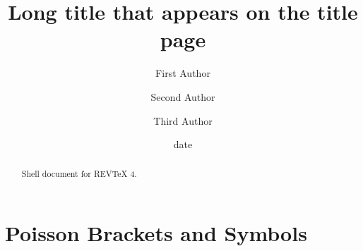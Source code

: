 \documentclass[aps,preprint]{revtex4}%
\begin{document}
\title[Short title for running header]{Long title that appears on the title page}
\author{First Author}
\author{Second Author}
\author{Third Author}

\begin{abstract}
Shell document for REV\TeX{} 4.

\end{abstract}
\date[Date text]{date}




\maketitle
\tableofcontents


\section{Poisson Brackets and Symbols}
\end{document}
